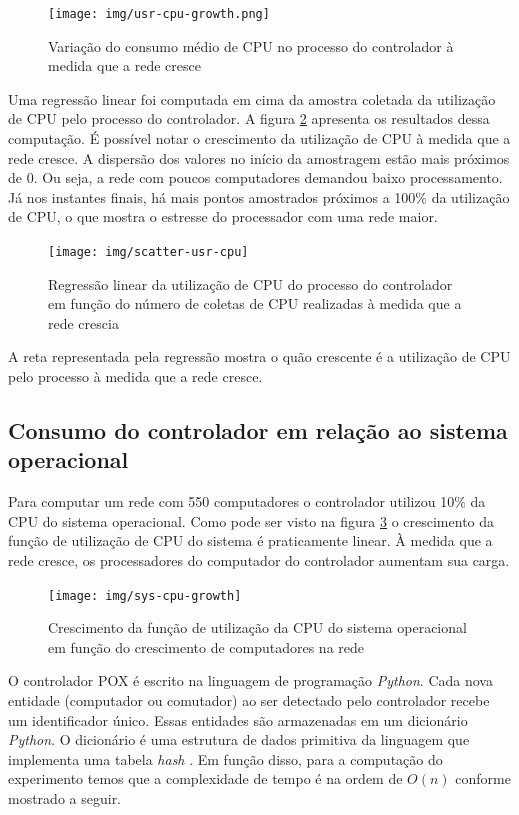 \begin{figure}[htb!]
    \centering
    \label{fig:usr-cpu-growth}
    \texttt{[image: img/usr-cpu-growth.png]}
    \caption{Variação do consumo médio de CPU no processo do controlador à
    medida que a rede cresce}
\end{figure}

Uma regressão linear foi computada em cima da amostra coletada da utilização
de CPU pelo processo do controlador.
A figura \ref{fig:scatter-usr-cpu} apresenta os resultados dessa computação.
É possível notar o crescimento da utilização de CPU à medida que a rede cresce.
A dispersão dos valores no início da amostragem estão mais próximos de 0.
Ou seja, a rede com poucos computadores demandou baixo processamento.
Já nos instantes finais, há mais pontos amostrados próximos a 100\% da
utilização de CPU, o que mostra o estresse do processador com uma rede maior.

\begin{figure}[!htb]
    \centering
    \label{fig:scatter-usr-cpu}
    \texttt{[image: img/scatter-usr-cpu]}
    \caption{Regressão linear da utilização de CPU do processo do controlador
    em função do número de coletas de CPU realizadas à medida que a rede
    crescia}
\end{figure}

A reta representada pela regressão mostra o quão crescente é a utilização de
CPU pelo processo à medida que a rede cresce.


\subsection{Consumo do controlador em relação ao sistema operacional}

Para computar um rede com 550 computadores o controlador utilizou 10\% da
CPU do sistema operacional.
Como pode ser visto na figura \ref{fig:sys-cpu-growth} o crescimento da
função de utilização de CPU do sistema é praticamente linear.
À medida que a rede cresce, os processadores do computador do controlador
aumentam sua carga.

\begin{figure}[!htb]
    \centering
    \label{fig:sys-cpu-growth}
    \texttt{[image: img/sys-cpu-growth]}
    \caption{Crescimento da função de utilização da CPU do sistema operacional
    em função do crescimento de computadores na rede}
\end{figure}

O controlador POX é escrito na linguagem de programação \emph{Python}.
Cada nova entidade (computador ou comutador) ao ser detectado pelo controlador
recebe um identificador único.
Essas entidades são armazenadas em um dicionário \emph{Python}.
O dicionário é uma estrutura de dados primitiva da linguagem que implementa
uma tabela \emph{hash} \citep{maurer1975hash}.
Em função disso, para a computação do experimento temos que a complexidade
de tempo é na ordem de $O(n)$ conforme mostrado a seguir.

